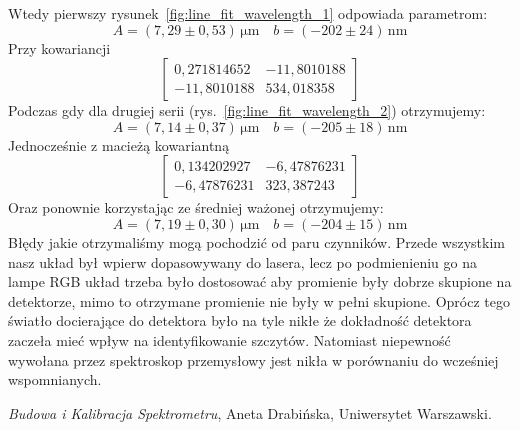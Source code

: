 \documentclass[12pt]{article}
\begin{document}
Wtedy pierwszy rysunek~\ref{fig:line_fit_wavelength_1} odpowiada parametrom:
\[
	A = (7{,}29 \pm 0{,}53) \, \mathrm{\mu m} \quad b = (-202 \pm 24) \, \mathrm{nm}
\]
Przy kowariancji
\[
	\begin{bmatrix}
		0{,}271814652 & -11{,}8010188 \\
		-11{,}8010188 & 534{,}018358
	\end{bmatrix}
\]
Podczas gdy dla drugiej serii (rys.~\ref{fig:line_fit_wavelength_2}) otrzymujemy:
\[
	A = (7{,}14 \pm 0{,}37) \, \mathrm{\mu m} \quad b = (-205 \pm 18) \, \mathrm{nm}
\]
Jednocześnie z macieżą kowariantną
\[
	\begin{bmatrix}
		0{,}134202927 & -6{,}47876231 \\
		-6{,}47876231 & 323{,}387243
	\end{bmatrix}
\]
Oraz ponownie korzystając ze średniej ważonej otrzymujemy:
\[
	A = (7{,}19 \pm 0{,}30) \, \mathrm{\mu m} \quad b = (-204 \pm 15) \, \mathrm{nm}
\]
Błędy jakie otrzymaliśmy mogą pochodzić od paru czynników. Przede wszystkim nasz układ był wpierw dopasowywany do lasera, lecz po podmienieniu go na lampe RGB układ trzeba było dostosować aby promienie były dobrze skupione na detektorze, mimo to otrzymane promienie nie były w pełni skupione. Oprócz tego światło docierające do detektora było na tyle nikłe że dokładność detektora zaczeła mieć wpływ na identyfikowanie szczytów. Natomiast niepewność wywołana przez spektroskop przemysłowy jest nikła w porównaniu do wcześniej wspomnianych.
\begin{thebibliography}{1}

	\emph{Budowa i Kalibracja Spektrometru}, Aneta Drabińska, Uniwersytet Warszawski.

\end{thebibliography}
\end{document}

